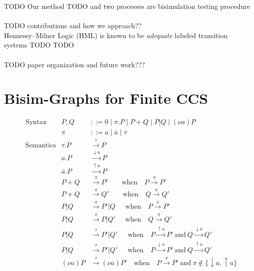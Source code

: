 \documentclass{llncs}
\begin{document}
TODO Our method TODO
and 
two processes are
bisimulation testing procedure


\paragraph{} TODO contributions and how we approach??\\
Hennessy--Milner Logic (HML) is known to be \emph{adequate}
labeled transition systems TODO TODO

\paragraph{} TODO paper organization and future work???

\section{Bisim-Graphs for Finite CCS} \label{sec:ccsbisim}

\begin{align*}
&\text{Syntax} &
P,Q &::= 0 \mid \pi.P \mid P + Q \mid P|Q \mid (\nu a)P \\ &&
\pi &::= a \mid \bar{a} \mid \tau
\\
&\text{Semantics} &
\tau.P &\xrightarrow{\tau} P \\ &&
a.P &\xrightarrow{\downarrow a} P \\ &&
\bar{a}.P &\xrightarrow{\uparrow a} P \\ &&
P+Q &\xrightarrow{\pi} P' \qquad\text{when}\quad P \xrightarrow{\pi} P' \\ &&
P+Q &\xrightarrow{\pi} Q' \qquad\text{when}\quad Q \xrightarrow{\pi} Q' \\ &&
P|Q &\xrightarrow{\pi} P'|Q ~~\quad\text{when}\quad P \xrightarrow{\pi} P' \\ &&
P|Q &\xrightarrow{\pi} P|Q' ~~\quad\text{when}\quad Q \xrightarrow{\pi} Q' \\ &&
P|Q &\xrightarrow{\tau} P'|Q' ~\;\quad\text{when}\quad
  P \xrightarrow{\uparrow a} P' ~\text{and}~
  Q \xrightarrow{\downarrow a} Q' \\ &&
P|Q &\xrightarrow{\tau} P'|Q' ~\;\quad\text{when}\quad
  P \xrightarrow{\downarrow a} P' ~\text{and}~
  Q \xrightarrow{\uparrow a} Q' \\ &&
(\nu a)P &\xrightarrow{\tau} (\nu a)P' \quad\text{when}\quad
  P \xrightarrow{\pi} P' ~\text{and}~ \pi \notin \{\downarrow a, \uparrow a\}
\end{align*}
\end{document}
